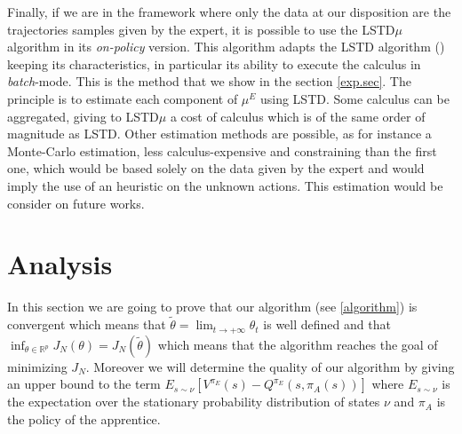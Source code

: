 \documentclass{article}
\begin{document}
Finally, if we are in the framework where only the data at our disposition are the trajectories samples given by the expert, it is possible to use the LSTD$\mu$ algorithm \citep{klein2011batch} in its \emph{on-policy} version. This algorithm adapts the LSTD algorithm (\cite{bradtke1996linear}) keeping its characteristics, in particular its ability to execute the calculus in  {\it batch}-mode. This is the method that we show in the section \ref{exp.sec}. The principle is to estimate each component of $\mu^E$ using LSTD. Some calculus can be aggregated, giving to LSTD$\mu$ a cost of calculus which is of the same order of magnitude as LSTD.
Other estimation methods are possible, as for instance a Monte-Carlo estimation, less calculus-expensive and constraining than the first one, which would be based solely on the data given by the expert and would imply the use of an heuristic on the unknown actions. This estimation would be consider on future works.
\section{Analysis}\label{proof.sec}
In this section we are going to prove that our algorithm (see \eqref{algorithm}) is convergent which means that $\tilde{\theta}=\lim_{t\rightarrow+\infty}\theta_t$ is well defined and that $\inf_{\theta\in\mathbb{R}^p}J_N(\theta)=J_N(\tilde{\theta})$ which means that the algorithm reaches the goal of minimizing $J_N$. Moreover we will determine the quality of our algorithm by giving an upper bound to the term $E_{s\sim\nu}[V^{\pi_E}(s)-Q^{\pi_E}(s,\pi_A(s))]$ where $E_{s\sim\nu}$ is the expectation over the stationary probability distribution of states $\nu$ and $\pi_A$ is the policy of the apprentice.
\end{document}
